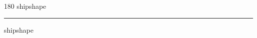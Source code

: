 
\begin{frame}
\begin{center}
\begin{turn}{180}
{\fontsize{2.5cm}{1em}\selectfont shipshape}
\end{turn}
\vspace{1em}\par  
\hrule
\vspace{1em}\par  
{\fontsize{2.5cm}{1em}\selectfont shipshape}
\end{center}
\end{frame}
